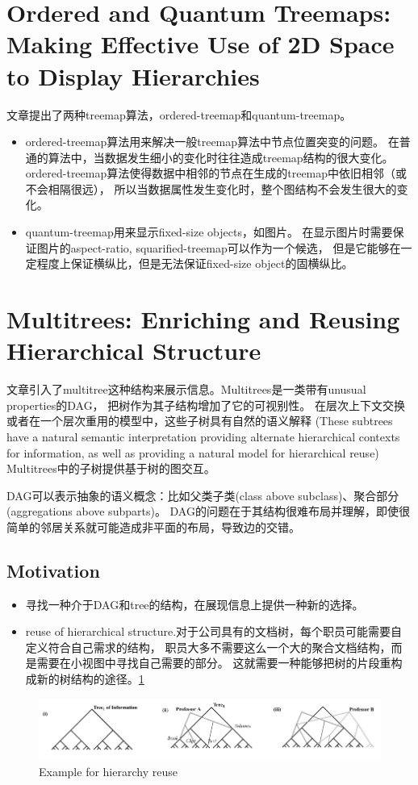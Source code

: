 \documentclass{article}
\begin{document}
\section{Ordered and Quantum Treemaps: Making Effective Use of
	2D Space to Display Hierarchies\cite{Bederson2002}}

	文章提出了两种treemap算法，ordered-treemap和quantum-treemap。

	\begin{itemize}
		\item ordered-treemap算法用来解决一般treemap算法中节点位置突变的问题。
			在普通的算法中，当数据发生细小的变化时往往造成treemap结构的很大变化。
			ordered-treemap算法使得数据中相邻的节点在生成的treemap中依旧相邻（或不会相隔很远），
			所以当数据属性发生变化时，整个图结构不会发生很大的变化。
		\item quantum-treemap用来显示fixed-size objects，如图片。
			在显示图片时需要保证图片的aspect-ratio, squarified-treemap可以作为一个候选，
			但是它能够在一定程度上保证横纵比，但是无法保证fixed-size object的固横纵比。
	\end{itemize}

\section{Multitrees: Enriching and Reusing Hierarchical Structure\cite{Furnas1994}}
	文章引入了multitree这种结构来展示信息。Multitrees是一类带有unusual properties的DAG，
	把树作为其子结构增加了它的可视别性。
	在层次上下文交换或者在一个层次重用的模型中，这些子树具有自然的语义解释
	(These subtrees have a natural semantic interpretation providing alternate hierarchical
	contexts for information, as well as providing a natural model for hierarchical reuse)
	Multitrees中的子树提供基于树的图交互。

	DAG可以表示抽象的语义概念：比如父类子类(class above subclass)、聚合部分(aggregations above subparts)。
	DAG的问题在于其结构很难布局并理解，即使很简单的邻居关系就可能造成非平面的布局，导致边的交错。
	\subsection{Motivation}

	\begin{itemize}
		\item 寻找一种介于DAG和tree的结构，在展现信息上提供一种新的选择。
		\item reuse of hierarchical structure.对于公司具有的文档树，每个职员可能需要自定义符合自己需求的结构，
			职员大多不需要这么一个大的聚合文档结构，而是需要在小视图中寻找自己需要的部分。
			这就需要一种能够把树的片段重构成新的树结构的途径。\ref{fig:multitree_1}
	\end{itemize}
	\begin{figure}[h]
		\centering
		\includegraphics[width=\textwidth]{_img/Multitrees_1.png}
		\caption{Example for hierarchy reuse}
		\label{fig:multitree_1}
	\end{figure}
\end{document}
